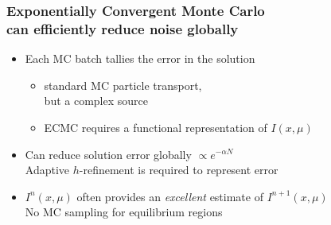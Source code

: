 \documentclass[xcolor=dvipsnames,hyperref={pdfpagelabels=false},unknownkeysallowed]{beamer}
\newcommand{\colb}[1]{{\color{blue} #1}}
\newcommand{\colG}[1]{{\color{Gray!110} #1}}
\newcommand{\colr}[1]{{\color{red} #1}}
\newlength{\wideitemsep}
\let\olditem\item
\renewcommand{\item}{\setlength{\itemsep}{\wideitemsep}\olditem}
\begin{document}
{\addtolength\leftmargini{-0.165in}
\begin{frame}
    \frametitle{Exponentially Convergent Monte Carlo \\ can efficiently reduce noise globally}
    \begin{itemize}
            \addtolength{\wideitemsep}{0.14in}
        \item[] Each MC batch tallies the \colb{error} in the solution 
            \begin{itemize}
                \item \colG{standard MC particle transport,\\ but a \colr{complex} source}
                    \vspace{-0.21in}
                \item \colG{ECMC requires  a \colr{functional} representation of $I(x,\mu)$}
    \end{itemize}

        \item[] Can reduce solution error \colb{globally} $\propto e^{-\alpha N}$ \\
            \colG{Adaptive $h$-refinement is required to represent error}
        \item[] $I^{n}(x,\mu)$ often provides an \emph{excellent} estimate of
            $I^{n+1}(x,\mu)$\\  \colG{No MC sampling for equilibrium regions}
     \end{itemize}
 \end{frame}
 }
\end{document}
